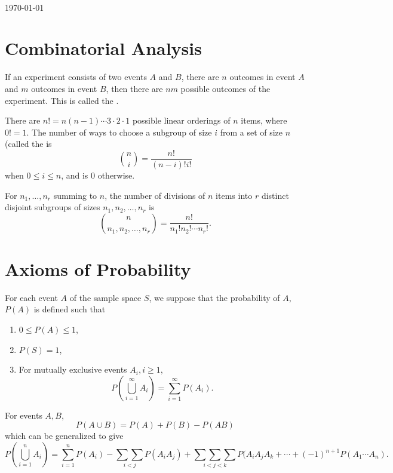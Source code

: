 \documentclass{article}
\begin{document}
\begin{titlepage}
\begin{minipage}{0.4\textwidth}
\end{minipage}\\[2cm]



{\large \today}\\[2cm] %

\vfill %

\end{titlepage}

\section{Combinatorial Analysis}

If an experiment consists of two events $A$ and $B$, there are $n$ outcomes in event $A$ and $m$ outcomes in event $B$, then there are $nm$ possible outcomes of the experiment. This is called the .

There are $n!=n(n-1)\dotsi3\cdot2\cdot1$ possible linear orderings of $n$ items, where $0!=1$. The number of ways to choose a subgroup of size $i$ from a set of size $n$ (called the  is
\[{n\choose i}=\frac{n!}{(n-i)!i!}\]when $0\leq i\leq n$, and is $0$ otherwise. 

For $n_{1},\dotsc,n_{r}$ summing to $n$, the number of divisions of $n$ items into $r$ distinct disjoint subgroups of sizes $n_{1},n_{2},\dotsc,n_{r}$ is
\[{n\choose n_{1},n_{2},\dotsc,n_{r}}=\frac{n!}{n_{1}!n_{2}!\dotsi n_{r}!}.\]

\section{Axioms of Probability}
For each event $A$ of the sample space $S$, we suppose that the probability of $A$, $P(A)$ is defined such that 
\begin{enumerate}
    \item $0\leq P(A)\leq 1$,
    \item $P(S)=1$,
    \item For mutually exclusive events $A_{i},i\geq 1$,
    \[P\left(\bigcup_{i=1}^{\infty}A_{i}\right)=\sum_{i=1}^{\infty}P(A_{i}).\]
\end{enumerate}
\begin{theorem}
    For events $A,B$,
    \[P(A\cup B)=P(A)+P(B)-P(AB)\]
    which can be generalized to give
    \[P\left(\bigcup_{i=1}^{n}A_{i}\right)=\sum_{i=1}^{n}P(A_{i})-\underset{i<j}{\sum\sum}P(A_{i}A_{j})+\underset{i<j<k}{\sum\sum\sum}P(A_{i}A_{j}A_{k}+\dotsi+(-1)^{n+1}P(A_{1}\dotsi A_{n}).\]
\end{theorem}
\end{document}
